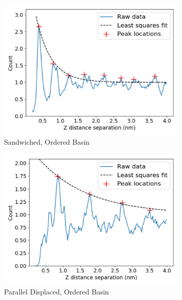 \documentclass[journal=jpcbfk,manuscript=article]{achemso}
\begin{document}
  \begin{figure}[!htb]
  \centering
  \begin{subfigure}{0.45\textwidth}
  \centering
  \includegraphics[width=\textwidth]{z_correlation_sandwich.pdf}
  \caption{Sandwiched, Ordered Basin}\label{fig:z_correlation_sandwich}
  \end{subfigure}  
  \begin{subfigure}{0.45\textwidth}
  \centering
  \includegraphics[width=\textwidth]{z_correlation_offset.pdf}
  \caption{Parallel Displaced, Ordered Basin}\label{fig:z_correlation_offset}
  \end{subfigure}  
  \begin{subfigure}{0.45\textwidth}
  \centering

\end{subfigure}
\end{figure}
\end{document}

